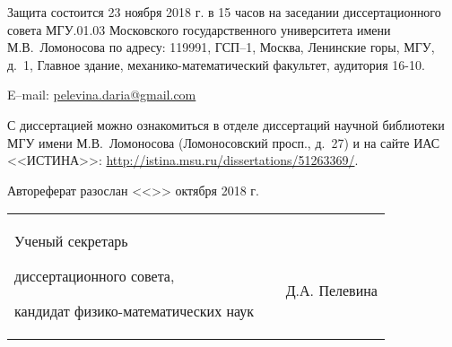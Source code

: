 \documentclass[a4paper,14pt,
oneside]{extbook}
\begin{document}
Защита состоится 23 ноября 2018 г. в 15 часов на
заседании диссертационного совета МГУ.01.03 Московского
государственного университета имени М.В.~Ломоносова по адресу:
119991, ГСП--1, Москва, Ленинские горы, МГУ, д.~1, Главное здание, механико-математический
факультет, аудитория 16-10.

\vsp

E--mail: \href{pelevina.daria@gmail.com}{pelevina.daria@gmail.com}

\vsp

С диссертацией можно ознакомиться в отделе диссертаций научной библиотеки МГУ имени М.В.~Ломоносова (Ломоносовский просп., д.~27) и на сайте ИАС <<ИСТИНА>>: \url{http://istina.msu.ru/dissertations/51263369/}.

\vsp

Автореферат разослан <<\underline{\hspace{1.0cm}}>> октября 2018 г.

\vsp

\vfill

\noindent\begin{tabular}{@{}p{10cm}@{}p{4cm}@{}p{3.5cm}@{}}
Ученый секретарь

диссертационного совета,

кандидат физико-математических наук
 &
$\:$

 &
$\:$

$\:$

\raggedleft  Д.А. Пелевина\\
\end{tabular}

\newpage




\end{document}
